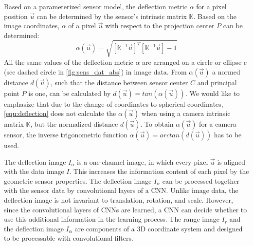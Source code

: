 Based on a parameterized sensor model, the deflection metric  $\alpha$ for a pixel position $\vec{u}$ can be determined by the sensor's intrinsic matrix $\mathbb{K}$. Based on the image coordinates, $\alpha$ of a pixel $\vec{u}$ with respect to the projection center $P$ can be determined:
\begin{equation}
\alpha(\vec{u}) = \sqrt{\left[\mathbb{K}^{-1}\vec{u}\right]^T\left[\mathbb{K}^{-1}\vec{u}\right] - 1}
\label{equ:deflection}
\end{equation}
All the same values of the deflection metric $\alpha$ are arranged on a circle or ellipse $e$ (see dashed circle in \autoref{fig:sens_dat_abs}) in image data. 
From $\alpha(\vec{u})$ a normed distance $d(\vec{u})$, such that the distance between sensor center $C$ and principal point $P$ is one, can be calculated by $d(\vec{u})= tan(\alpha(\vec{u}))$. We would like to emphasize that due to the change of coordinates to spherical coordinates, \autoref{equ:deflection} does not calculate the $\alpha(\vec{u})$ when using a camera intrinsic matrix $\mathbb{K}$, but the normalized distance $d(\vec{u})$. To obtain $\alpha(\vec{u})$ for a camera sensor, the inverse trigonometric function $\alpha(\vec{u})= arctan(d(\vec{u}))$ has to be used.

The deflection image $I_{\alpha}$ is a one-channel image, in which every pixel $\vec{u}$ is aligned with the data image $I$. This increases the information content of each pixel by the geometric sensor properties. The deflection image $I_{\alpha}$ can be processed together with the sensor data by convolutional layers of a CNN. Unlike image data, the deflection image is not invariant to translation, rotation, and scale. However, since the convolutional layers of CNNs are learned, a CNN can decide whether to use this additional information in the learning process. 
The range image $I_{r}$ and the deflection image $I_{\alpha}$ are components of a 3D coordinate system and designed to be processable with convolutional filters. 


